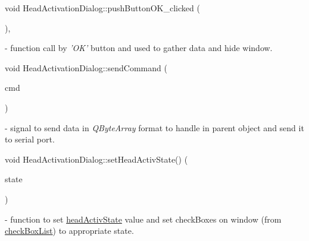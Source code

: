 \mbox{\label{classHeadActivationDialog_a544834488f3b17daa84f2f126cd405b1}} 
{\footnotesize\ttfamily void Head\+Activation\+Dialog\+::\texorpdfstring{push\+Button\+O\+K\+\_\+clicked}{pushButtonOK\_clicked} (\begin{DoxyParamCaption}{ }\end{DoxyParamCaption}){\ttfamily [private]}, {\ttfamily [slot]}} - function call by \textit{'OK'} button and used to gather data and hide window.

\mbox{\label{classHeadActivationDialog_ae76f8ea5faecab0d161904b14d925bda}} 
{\footnotesize\ttfamily void Head\+Activation\+Dialog\+::\texorpdfstring{send\+Command}{sendCommand} (\begin{DoxyParamCaption}\item[{Q\+Byte\+Array}]{cmd }\end{DoxyParamCaption}){\ttfamily [signal]}} - signal to send data in \textit{Q\+Byte\+Array} format to handle in parent object and send it to serial port.

\mbox{\label{classHeadActivationDialog_a471339dee05798a94de85a2ee2cd43c4}} 
{\footnotesize\ttfamily void Head\+Activation\+Dialog\+::\texorpdfstring{set\+Head\+Activ\+State()}{setHeadActivState()} (\begin{DoxyParamCaption}\item[{\mbox{\hyperlink{settings_8h_a4196118492a3b1493c81f250e90af775}{uint32\+\_\+t}}}]{state }\end{DoxyParamCaption})} - function to set \hyperlink{classHeadActivationDialog_a720bae08173514106fd2bdfda9a8e902}{head\+Activ\+State} value and set check\+Boxes on window (from \hyperlink{classHeadActivationDialog_ae6fb828d26fda5b86510b5e427f24d06}{check\+Box\+List}) to appropriate state.

